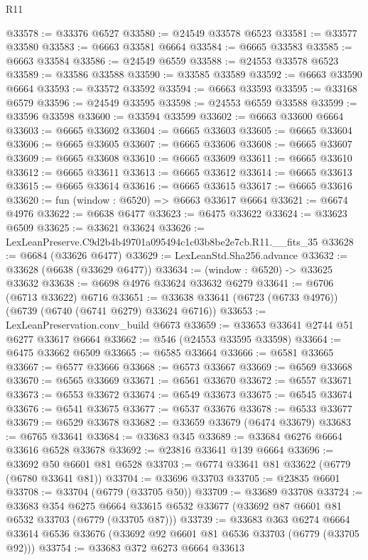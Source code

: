 \begin{lexlean}{R11}
\begin{coremodule}
@33578 := @33376 @6527
@33580 := @24549 @33578 @6523
@33581 := @33577 @33580
@33583 := @6663 @33581 @6664
@33584 := @6665 @33583
@33585 := @6663 @33584
@33586 := @24549 @6559
@33588 := @24553 @33578 @6523
@33589 := @33586 @33588
@33590 := @33585 @33589
@33592 := @6663 @33590 @6664
@33593 := @33572 @33592
@33594 := @6663 @33593
@33595 := @33168 @6579
@33596 := @24549 @33595
@33598 := @24553 @6559 @33588
@33599 := @33596 @33598
@33600 := @33594 @33599
@33602 := @6663 @33600 @6664
@33603 := @6665 @33602
@33604 := @6665 @33603
@33605 := @6665 @33604
@33606 := @6665 @33605
@33607 := @6665 @33606
@33608 := @6665 @33607
@33609 := @6665 @33608
@33610 := @6665 @33609
@33611 := @6665 @33610
@33612 := @6665 @33611
@33613 := @6665 @33612
@33614 := @6665 @33613
@33615 := @6665 @33614
@33616 := @6665 @33615
@33617 := @6665 @33616
@33620 := fun (window : @6520) => @6663 @33617 @6664
@33621 := @6674 @4976
@33622 := @6638 @6477
@33623 := @6475 @33622
@33624 := @33623 @6509
@33625 := @33621 @33624
@33626 := LexLeanPreserve.C9d2b4b49701a095494c1c03b8be2e7cb.R11.__fits_35
@33628 := @6684 (@33626 @6477)
@33629 := LexLeanStd.Sha256.advance
@33632 := @33628 (@6638 (@33629 @6477))
@33634 := (window : @6520) -> @33625 @33632
@33638 := @6698 @4976 @33624 @33632 @6279
@33641 := @6706 (@6713 @33622) @6716
@33651 := @33638 @33641 (@6723 (@6733 @4976)) (@6739 (@6740 (@6741 @6279) @33624 @6716))
@33653 := LexLeanPreservation.conv_build @6673
@33659 := @33653 @33641 @2744 @51 @6277 @33617 @6664
@33662 := @546 (@24553 @33595 @33598)
@33664 := @6475 @33662 @6509
@33665 := @6585 @33664
@33666 := @6581 @33665
@33667 := @6577 @33666
@33668 := @6573 @33667
@33669 := @6569 @33668
@33670 := @6565 @33669
@33671 := @6561 @33670
@33672 := @6557 @33671
@33673 := @6553 @33672
@33674 := @6549 @33673
@33675 := @6545 @33674
@33676 := @6541 @33675
@33677 := @6537 @33676
@33678 := @6533 @33677
@33679 := @6529 @33678
@33682 := @33659 @33679 (@6474 @33679)
@33683 := @6765 @33641
@33684 := @33683 @345
@33689 := @33684 @6276 @6664 @33616 @6528 @33678
@33692 := @23816 @33641 @139 @6664
@33696 := @33692 @50 @6601 @81 @6528
@33703 := @6774 @33641 @81 @33622 (@6779 (@6780 @33641 @81))
@33704 := @33696 @33703
@33705 := @23835 @6601
@33708 := @33704 (@6779 (@33705 @50))
@33709 := @33689 @33708
@33724 := @33683
    @354
    @6275
    @6664
    @33615
    @6532
    @33677
    (@33692 @87 @6601 @81 @6532 @33703 (@6779 (@33705 @87)))
@33739 := @33683
    @363
    @6274
    @6664
    @33614
    @6536
    @33676
    (@33692 @92 @6601 @81 @6536 @33703 (@6779 (@33705 @92)))
@33754 := @33683
    @372
    @6273
    @6664
    @33613

\end{coremodule}
\end{lexlean}
